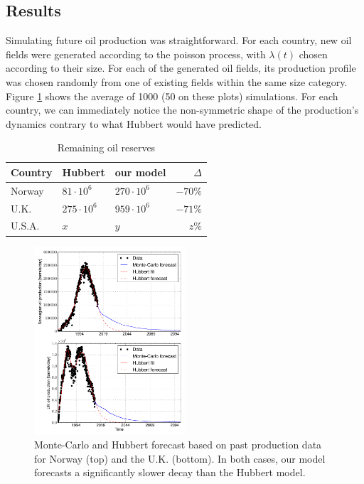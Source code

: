 \documentclass[twoside]{article}
\begin{document}
\begin{multicols}{2}

\section{Results}

Simulating future oil production was straightforward. For each country, new oil fields were generated according to the poisson process, with $\lambda(t)$ chosen according to their size. For each of the generated oil fields, its production profile was chosen randomly from one of existing fields within the same size category. Figure \ref{no_uk_2013} shows the average of 1000 (50 on these plots) simulations. For each country, we can immediately notice the non-symmetric shape of the production's dynamics contrary to what Hubbert would have predicted.

\begin{table}[H]
\caption{Remaining oil reserves}
\centering
\begin{tabular}{lllr}
Country & Hubbert & our model & $\Delta$ \\
\midrule
Norway & $81 \cdot 10^6$ & $270 \cdot 10^6$ & $-70\%$\\
U.K. & $275 \cdot 10^6$ & $959 \cdot 10^6$ & $-71\%$ \\
U.S.A. & $x$ & $y$ & $z\%$ \\
\bottomrule
\end{tabular}
\end{table}

\begin{figure}[H]
    \includegraphics[width=0.5\textwidth]{no_and_uk_2013.pdf}
    \caption{Monte-Carlo and Hubbert forecast based on past production data for Norway (top) and the U.K. (bottom).  In both cases, our model forecasts a significantly slower decay than the Hubbert model.}
    \label{no_uk_2013}
\end{figure}


\end{multicols}
\end{document}
